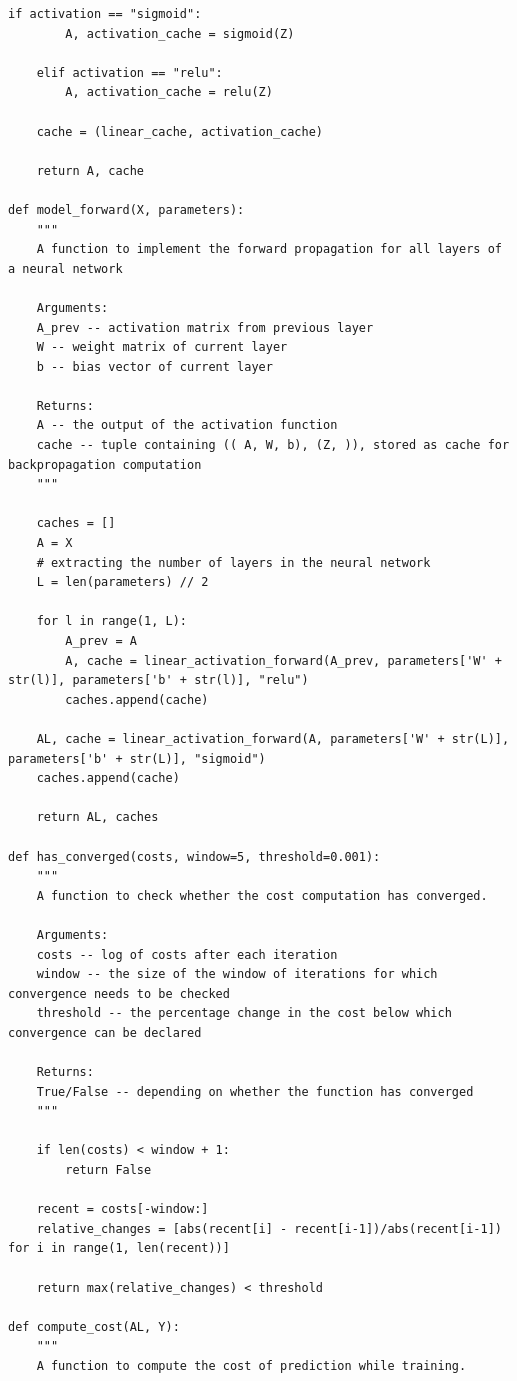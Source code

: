 \documentclass{article}
\begin{document}
\begin{lstlisting}[caption={Neural network functions - NN\_helper\_functions.py}]
    if activation == "sigmoid":
        A, activation_cache = sigmoid(Z)

    elif activation == "relu":
        A, activation_cache = relu(Z)
    
    cache = (linear_cache, activation_cache)

    return A, cache

def model_forward(X, parameters):
    """
    A function to implement the forward propagation for all layers of a neural network

    Arguments:
    A_prev -- activation matrix from previous layer
    W -- weight matrix of current layer
    b -- bias vector of current layer

    Returns:
    A -- the output of the activation function
    cache -- tuple containing (( A, W, b), (Z, )), stored as cache for backpropagation computation
    """

    caches = []
    A = X
    # extracting the number of layers in the neural network
    L = len(parameters) // 2

    for l in range(1, L):
        A_prev = A
        A, cache = linear_activation_forward(A_prev, parameters['W' + str(l)], parameters['b' + str(l)], "relu")
        caches.append(cache)
    
    AL, cache = linear_activation_forward(A, parameters['W' + str(L)], parameters['b' + str(L)], "sigmoid")
    caches.append(cache)

    return AL, caches

def has_converged(costs, window=5, threshold=0.001):
    """
    A function to check whether the cost computation has converged.

    Arguments:
    costs -- log of costs after each iteration
    window -- the size of the window of iterations for which convergence needs to be checked
    threshold -- the percentage change in the cost below which convergence can be declared

    Returns:
    True/False -- depending on whether the function has converged
    """

    if len(costs) < window + 1:
        return False
    
    recent = costs[-window:]
    relative_changes = [abs(recent[i] - recent[i-1])/abs(recent[i-1]) for i in range(1, len(recent))]

    return max(relative_changes) < threshold

def compute_cost(AL, Y):
    """
    A function to compute the cost of prediction while training.


\end{lstlisting}
\end{document}

